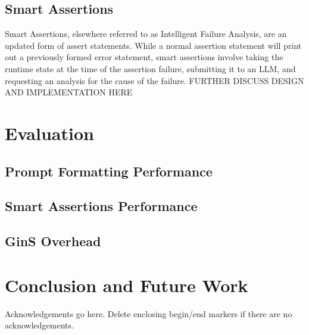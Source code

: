 \documentclass[sigconf]{acmart}
\begin{document}
\subsection{Smart Assertions}
Smart Assertions, elsewhere referred to as Intelligent Failure Analysis, are an updated form of assert statements.
While a normal assertion statement will print out a previously formed error statement, smart assertions involve taking the runtime state at the time of the assertion failure, submitting it to an LLM, and requesting an analysis for the cause of the failure.
FURTHER DISCUSS DESIGN AND IMPLEMENTATION HERE

\section{Evaluation}

\subsection{Prompt Formatting Performance}

\subsection{Smart Assertions Performance}

\subsection{GinS Overhead}

\section{Conclusion and Future Work}

\begin{acks}
Acknowledgements go here. Delete enclosing begin/end markers if there are no acknowledgements.
\end{acks}




\end{document}
